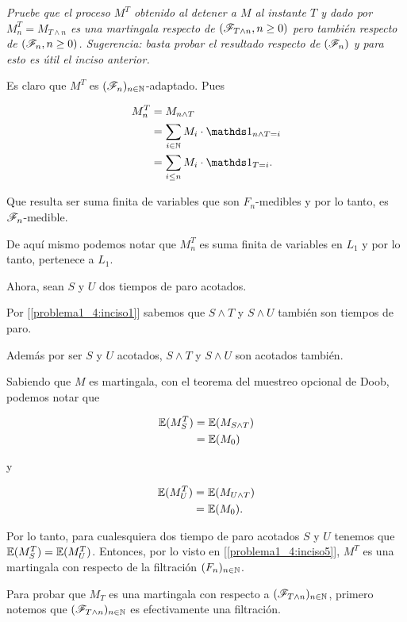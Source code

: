 \emph{
	Pruebe que el proceso $M^T$ obtenido al detener a $M$ al instante $T$ y dado por $M^T_n=M_{T\wedge n}$ es una 
	martingala respecto de $\left( \mathscr{F}_{T\wedge n},n\geq 0\right) $ pero tambi\'en respecto de $\left( \mathscr{F}_{n},n\geq 0\right) $. 
	Sugerencia: basta probar el resultado respecto de $\left( \mathscr{F}_n\right) $ y para esto es \'util el inciso anterior.
}

\afterstatement\pn

	Es claro que $M^T$ es $(\mathscr{F}_n)_{n \in \mathbb{N}}$-adaptado. Pues
    
	\begin{align}
		M_n^T 		&= 		M_{n \wedge T} 									        \\
					&= 		\sum_{i \in \N} M_i \cdot \indic_{n \wedge T = i}		\\
					&=      \sum_{i \leq n} M_i \cdot \indic_{T = i}.
	\end{align}\pn		

	Que resulta ser suma finita de variables que son $F_n$-medibles y por lo tanto,
	es $\mathscr{F}_n$-medible.\pn
	
	De aquí mismo podemos notar que $M_n^T$ es suma finita de variables en $L_1$ y por
	lo tanto, pertenece a $L_1$.\pn
	
	Ahora, sean $S$ y $U$ dos tiempos de paro acotados.\pn
	
	Por [\ref{problema1_4:inciso1}] sabemos que $S \wedge T$ y $S \wedge U$ también son tiempos de paro.\pn
	
	Además por ser $S$ y $U$ acotados, $S \wedge T$ y $S \wedge U$ son acotados también.\pn

	Sabiendo que $M$ es martingala, con el teorema del muestreo opcional de Doob, podemos notar que
	
	\begin{align}
		\mathbb{E}(M_S^T) 	&=	\mathbb{E}(M_{S \wedge T}) \\
					&= \mathbb{E}(M_0)
	\end{align}\pn
	
	y
	
	\begin{align}
		\mathbb{E}(M_U^T) 	&=	\mathbb{E}(M_{U \wedge T}) \\
					&= \mathbb{E}(M_0).
	\end{align}\pn
	
	Por lo tanto, para cualesquiera dos tiempo de paro acotados $S$ y $U$ tenemos que $\mathbb{E}(M_S^T) = \mathbb{E}(M_U^T)$.
	Entonces, por lo visto en [\ref{problema1_4:inciso5}], $M^T$ es una martingala con respecto de la filtración
	$(F_n)_{n \in \mathbb{N}}$.\pn
	
	Para probar que $M_T$ es una martingala con respecto a $(\mathscr{F}_{T \wedge n})_{n \in \mathbb{N}}$, primero notemos que
	$(\mathscr{F}_{T \wedge n})_{n \in \mathbb{N}}$ es efectivamente una filtración.\pn
	
